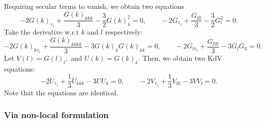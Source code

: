 \documentclass[10pt,reqno,oneside,a4paper]{article}
\begin{document}
Requiring secular terms to vanish, we obtain two equations
\[ -2G(k)_{\tau_{1}} + \frac{G(k)_{kkk}}{3} - \frac{3}{2}G(k)_k^2 = 0, \qquad -2G_{\tau_{1}} + \frac{G_{lll}}{3} - \frac{3}{2}G_l^2 = 0. \]
Take the derivative w.r.t $k$ and $l$ respectively:
\[ -2G(k)_{k\tau_{1}} + \frac{G(k)_{kkkk}}{3} - 3G(k)_kG(k)_{kk}= 0, \qquad -2G_{l\tau_{1}} + \frac{G_{llll}}{3} - 3G_lG_{ll} = 0. \]
Let $V(l) = G(l)_l,$ and $U(k) = G(k)_k.$ Then, we obtain two KdV equations:
\[ 
-2U_{\tau_{1}} + \frac{1}{3}U_{kkk} - 3UU_k= 0, \qquad -2V_{\tau_1} + \frac{1}{3}V_{lll} - 3VV_l = 0.
\]
Note that the equations are identical.
\subsubsection{Via non-local formulation}



{\small}
\end{document}
